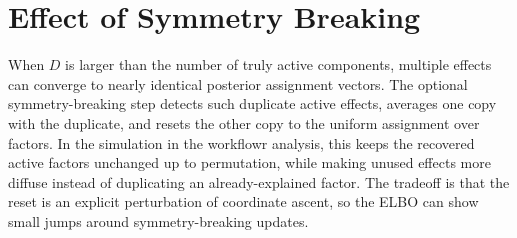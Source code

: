 \documentclass[11pt]{article}
\begin{document}
\section{Effect of Symmetry Breaking}

When $D$ is larger than the number of truly active components, multiple effects
can converge to nearly identical posterior assignment vectors. The optional
symmetry-breaking step detects such duplicate active effects, averages one copy
with the duplicate, and resets the other copy to the uniform assignment over
factors. In the simulation in the workflowr analysis, this keeps the recovered
active factors unchanged up to permutation, while making unused effects more
diffuse instead of duplicating an already-explained factor. The tradeoff is that
the reset is an explicit perturbation of coordinate ascent, so the ELBO can show
small jumps around symmetry-breaking updates.
\end{document}
